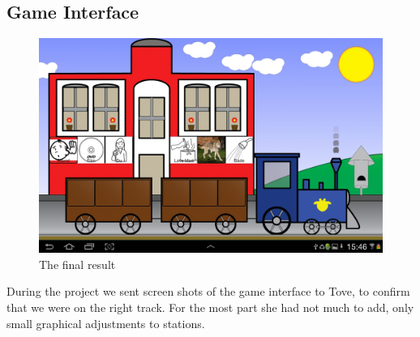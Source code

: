 \subsection*{Game Interface}
\begin{figure}[H]
\centering
\includegraphics[width=0.9\linewidth]{img/screenshots/gamedesign1.jpg}%
\caption{The final result}
\label{fig:finalresult}
\end{figure}
During the project we sent screen shots of the game interface to Tove, to confirm that we were on the right track. For the most part she had not much to add, only small graphical adjustments to stations.

